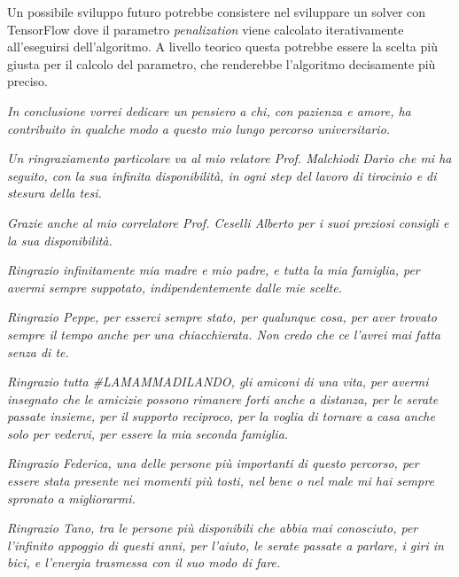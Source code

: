 \documentclass[a4paper,12pt]{report}
\begin{document}
Un possibile sviluppo futuro potrebbe consistere nel sviluppare un solver con TensorFlow dove il parametro \textit{penalization} viene calcolato iterativamente all'eseguirsi dell'algoritmo. A livello teorico questa potrebbe essere la scelta più giusta per il calcolo del parametro, che renderebbe l'algoritmo decisamente più preciso.


\textit{In conclusione vorrei dedicare un pensiero a chi, con pazienza e amore, ha contribuito in qualche modo a questo mio lungo percorso universitario.
}\bigskip

\noindent \textit{Un ringraziamento particolare va al mio relatore Prof. Malchiodi Dario che mi ha seguito, con la sua infinita disponibilità, in ogni step del lavoro di tirocinio e di stesura della tesi.}
\bigskip

\noindent \textit{Grazie anche al mio correlatore Prof. Ceselli Alberto per i suoi preziosi consigli e la sua disponibilità.}
\bigskip

\noindent \textit{Ringrazio infinitamente mia madre e mio padre, e tutta la mia famiglia, per avermi sempre suppotato, indipendentemente dalle mie scelte.}\bigskip

\noindent \textit{Ringrazio Peppe, per esserci sempre stato, per qualunque cosa, per aver trovato sempre il tempo anche per una chiacchierata. Non credo che ce l'avrei mai fatta senza di te.}
\bigskip

\noindent \textit{Ringrazio tutta \#LAMAMMADILANDO, gli amiconi di una vita, per avermi insegnato che le amicizie possono rimanere forti anche a distanza, per le serate passate insieme, per il supporto reciproco, per la voglia di tornare a casa anche solo per vedervi, per essere la mia seconda famiglia.}
\bigskip

\noindent \textit{Ringrazio Federica, una delle persone più importanti di questo percorso, per essere stata presente nei momenti più tosti, nel bene o nel male mi hai sempre spronato a migliorarmi.}
\bigskip

\noindent \textit{Ringrazio Tano, tra le persone più disponibili che abbia mai conosciuto, per l'infinito appoggio di questi anni, per l'aiuto, le serate passate a parlare, i giri in bici, e l'energia trasmessa con il suo modo di fare.}
\bigskip
\end{document}
